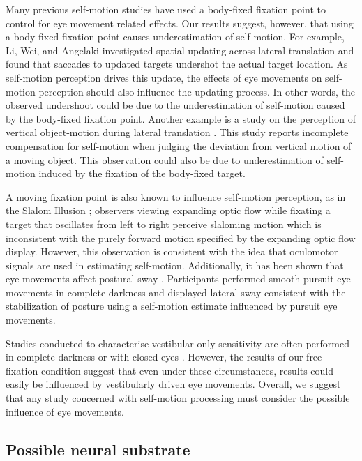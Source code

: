 Many previous self-motion studies have used a body-fixed fixation point to control for eye movement related effects. Our results suggest, however, that using a body-fixed fixation point causes underestimation of self-motion. For example, Li, Wei, and Angelaki \citeyear{li2005a} investigated spatial updating across lateral translation and found that saccades to updated targets undershot the actual target location. As self-motion perception drives this update, the effects of eye movements on self-motion perception should also influence the updating process. In other words, the observed undershoot could be due to the underestimation of self-motion caused by the body-fixed fixation point. Another example is a study on the perception of vertical object-motion during lateral translation \cite{dokka2013}. This study reports incomplete compensation for self-motion when judging the deviation from vertical motion of a moving object. This observation could also be due to underestimation of self-motion induced by the fixation of the body-fixed target.

A moving fixation point is also known to influence self-motion perception, as in the Slalom Illusion \cite{freeman2000}; observers viewing expanding optic flow while fixating a target that oscillates from left to right perceive slaloming motion which is inconsistent with the purely forward motion specified by the expanding optic flow display. However, this observation is consistent with the idea that oculomotor signals are used in estimating self-motion. Additionally, it has been shown that eye movements affect postural sway \cite{glasauer2005}.  Participants performed smooth pursuit eye movements in complete darkness and displayed lateral sway consistent with the stabilization of posture using a self-motion estimate influenced by pursuit eye movements.

Studies conducted to characterise vestibular-only sensitivity are often performed in complete darkness or with closed eyes \cite{grabherr2008,  macneilage2010b, macneilage2010a, roditi2012, valko2012, nesti2014}. However, the results of our free-fixation condition suggest that even under these circumstances, results could easily be influenced by vestibularly driven eye movements. Overall, we suggest that any study concerned with self-motion processing must consider the possible influence of eye movements.

\subsection{Possible neural substrate}

